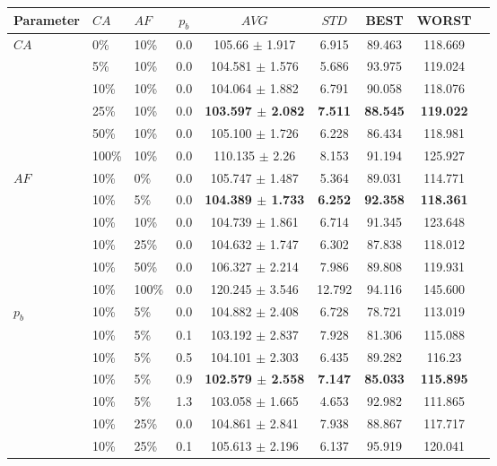 \begin{table}
    \centering
    \begin{tabular}{|l|l|l|c||c|c|c|c|c|}
    \hline
    Parameter & $CA$ & $AF$ & $p_b$ & $AVG$ & $STD$ &BEST & WORST \\
    \hline
    $CA$ & 0\% & 10\% & 0.0 & 105.66 $\pm$ 1.917 & 6.915 & 89.463 & 118.669\\
    ~ & 5\% & 10\% & 0.0 & 104.581 $\pm$ 1.576 & 5.686 & 93.975 & 119.024\\
    ~ & 10\% & 10\% & 0.0 & 104.064 $\pm$ 1.882 & 6.791 & 90.058 & 118.076\\
    ~ & 25\% & 10\% & 0.0 & \textbf{103.597 $\pm$ 2.082} & \textbf{7.511} & \textbf{88.545} & \textbf{119.022}\\
    ~ & 50\% & 10\% & 0.0 & 105.100 $\pm$ 1.726 & 6.228 & 86.434 & 118.981\\
    ~ & 100\% & 10\% & 0.0 & 110.135 $\pm$ 2.26 & 8.153 & 91.194 & 125.927\\
    \hline
    $AF$ & 10\% & 0\% & 0.0 & 105.747 $\pm$ 1.487 & 5.364& 89.031 & 114.771\\
    ~ & 10\% & 5\% & 0.0 & \textbf{104.389 $\pm$ 1.733} & \textbf{6.252}& \textbf{92.358} & \textbf{118.361}\\
    ~ & 10\% & 10\% & 0.0 & 104.739 $\pm$ 1.861 & 6.714 & 91.345 & 123.648\\
    ~ & 10\% & 25\% & 0.0 & 104.632 $\pm$ 1.747 & 6.302 & 87.838 & 118.012\\
    ~ & 10\% & 50\% & 0.0 & 106.327 $\pm$ 2.214 & 7.986 & 89.808 & 119.931\\
    ~ & 10\% & 100\% & 0.0 & 120.245 $\pm$ 3.546 & 12.792 & 94.116 & 145.600\\
    \hline
    $p_b$ & 10\% & 5\% & 0.0 & 104.882 $\pm$ 2.408 & 6.728 & 78.721 & 113.019\\
    ~ & 10\% & 5\% & 0.1 & 103.192 $\pm$ 2.837 & 7.928 & 81.306 & 115.088\\
    ~ & 10\% & 5\% & 0.5 & 104.101 $\pm$ 2.303 & 6.435 &89.282 & 116.23\\
    ~ & 10\% & 5\% & 0.9 & \textbf{102.579 $\pm$ 2.558} & \textbf{7.147} & \textbf{85.033} & \textbf{115.895}\\
    ~ & 10\% & 5\% & 1.3 & 103.058 $\pm$ 1.665 & 4.653 & 92.982 & 111.865\\
    ~ & 10\% & 25\% & 0.0 & 104.861 $\pm$ 2.841 & 7.938 & 88.867 & 117.717\\
    ~ & 10\% & 25\% & 0.1 & 105.613 $\pm$ 2.196 & 6.137 & 95.919 & 120.041\\

\end{tabular}
\end{table}
